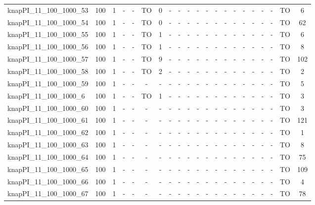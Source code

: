 \begin{sidewaystable}[!ht]
{\begin{tabular}{lcccccccccccccccccccc}
knapPI\_11\_100\_1000\_53 & 100 & 1 &  - &  - & TO & 0 &  - &  - &  - &  - &  - &  - &  - &  - &  - &  - &  - &  - & TO & 6 \\
knapPI\_11\_100\_1000\_54 & 100 & 1 &  - &  - & TO & 0 &  - &  - &  - &  - &  - &  - &  - &  - &  - &  - &  - &  - & TO & 62 \\
knapPI\_11\_100\_1000\_55 & 100 & 1 &  - &  - & TO & 1 &  - &  - &  - &  - &  - &  - &  - &  - &  - &  - &  - &  - & TO & 6 \\
knapPI\_11\_100\_1000\_56 & 100 & 1 &  - &  - & TO & 1 &  - &  - &  - &  - &  - &  - &  - &  - &  - &  - &  - &  - & TO & 8 \\
knapPI\_11\_100\_1000\_57 & 100 & 1 &  - &  - & TO & 9 &  - &  - &  - &  - &  - &  - &  - &  - &  - &  - &  - &  - & TO & 102 \\
knapPI\_11\_100\_1000\_58 & 100 & 1 &  - &  - & TO & 2 &  - &  - &  - &  - &  - &  - &  - &  - &  - &  - &  - &  - & TO & 2 \\
knapPI\_11\_100\_1000\_59 & 100 & 1 &  - &  - &  - &  - &  - &  - &  - &  - &  - &  - &  - &  - &  - &  - &  - &  - & TO & 5 \\
knapPI\_11\_100\_1000\_6 & 100 & 1 &  - &  - & TO & 1 &  - &  - &  - &  - &  - &  - &  - &  - &  - &  - &  - &  - & TO & 3 \\
knapPI\_11\_100\_1000\_60 & 100 & 1 &  - &  - &  - &  - &  - &  - &  - &  - &  - &  - &  - &  - &  - &  - &  - &  - & TO & 3 \\
knapPI\_11\_100\_1000\_61 & 100 & 1 &  - &  - &  - &  - &  - &  - &  - &  - &  - &  - &  - &  - &  - &  - &  - &  - & TO & 121 \\
knapPI\_11\_100\_1000\_62 & 100 & 1 &  - &  - &  - &  - &  - &  - &  - &  - &  - &  - &  - &  - &  - &  - &  - &  - & TO & 1 \\
knapPI\_11\_100\_1000\_63 & 100 & 1 &  - &  - &  - &  - &  - &  - &  - &  - &  - &  - &  - &  - &  - &  - &  - &  - & TO & 8 \\
knapPI\_11\_100\_1000\_64 & 100 & 1 &  - &  - &  - &  - &  - &  - &  - &  - &  - &  - &  - &  - &  - &  - &  - &  - & TO & 75 \\
knapPI\_11\_100\_1000\_65 & 100 & 1 &  - &  - &  - &  - &  - &  - &  - &  - &  - &  - &  - &  - &  - &  - &  - &  - & TO & 109 \\
knapPI\_11\_100\_1000\_66 & 100 & 1 &  - &  - &  - &  - &  - &  - &  - &  - &  - &  - &  - &  - &  - &  - &  - &  - & TO & 4 \\
knapPI\_11\_100\_1000\_67 & 100 & 1 &  - &  - &  - &  - &  - &  - &  - &  - &  - &  - &  - &  - &  - &  - &  - &  - & TO & 78 \\

\end{tabular}}
\end{sidewaystable}
